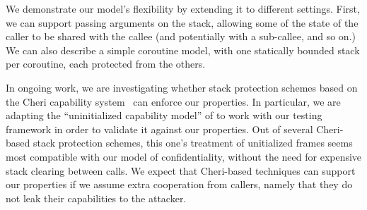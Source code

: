 \documentclass[acmtog,review,anonymous]{acmart}\settopmatter{printfolios=true,printccs=false,printacmref=false}
\begin{document}
We demonstrate our model's flexibility by extending it to different settings.
First, we can support passing arguments on the stack, allowing some of the state of
the caller to be shared with the callee (and potentially with a sub-callee,
and so on.)  We can also describe a simple coroutine model, with one
statically bounded stack per coroutine, each protected from the others.

In ongoing work, we are investigating whether stack protection schemes
based on the Cheri capability system~\citep{Woodruff+14,Chisnall+15}
can enforce our properties.  In particular, we are adapting
the ``uninitialized capability model'' of \citet{Georges+21} to work with
our testing framework in order to validate it against our properties. Out of several Cheri-based
stack protection schemes, this one's treatment of unitialized frames seems most compatible
with our model of confidentiality, without the need for expensive stack clearing
between calls. We expect that Cheri-based techniques can support our properties if we
assume extra cooperation from callers, namely that they do not leak their capabilities
to the attacker. %



\end{document}
